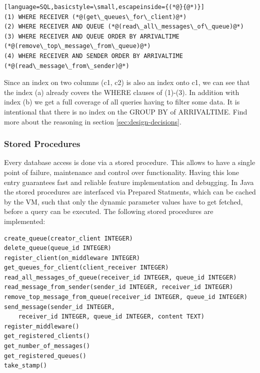 \documentclass[11pt]{article}
\begin{document}
\begin{lstlisting}[language=SQL,basicstyle=\small,escapeinside={(*@}{@*)}]
(1) WHERE RECEIVER (*@(get\_queues\_for\_client)@*)
(2) WHERE RECEIVER AND QUEUE (*@(read\_all\_messages\_of\_queue)@*)
(3) WHERE RECEIVER AND QUEUE ORDER BY ARRIVALTIME (*@(remove\_top\_message\_from\_queue)@*)
(4) WHERE RECEIVER AND SENDER ORDER BY ARRIVALTIME (*@(read\_message\_from\_sender)@*)
\end{lstlisting}
Since an index on two columns (c1, c2) is also an index onto c1, we can see that the index (a) already covers the WHERE clauses of (1)-(3). In addition with index (b) we get a full coverage of all queries having to filter some data. It is intentional that there is no index on the GROUP BY of ARRIVALTIME. Find more about the reasoning in section \ref{sec:design-decisions}.

\subsubsection{Stored Procedures}\label{sec:stored-procedures}
Every database access is done via a stored procedure. This allows to have a single point of failure, maintenance and control over functionality. Having this lone entry guarantees fast and reliable feature implementation and debugging. In Java the stored procedures are interfaced via Prepared Statments, which can be cached by the VM, such that only the dynamic parameter values have to get fetched, before a query can be executed. The following stored procedures are implemented:
\begin{lstlisting}[basicstyle=\small]
create_queue(creator_client INTEGER)
delete_queue(queue_id INTEGER)
register_client(on_middleware INTEGER)
get_queues_for_client(client_receiver INTEGER)
read_all_messages_of_queue(receiver_id INTEGER, queue_id INTEGER)
read_message_from_sender(sender_id INTEGER, receiver_id INTEGER)
remove_top_message_from_queue(receiver_id INTEGER, queue_id INTEGER)
send_message(sender_id INTEGER,
	receiver_id INTEGER, queue_id INTEGER, content TEXT)
register_middleware()
get_registered_clients()
get_number_of_messages()
get_registered_queues()
take_stamp()
\end{lstlisting}
\end{document}
